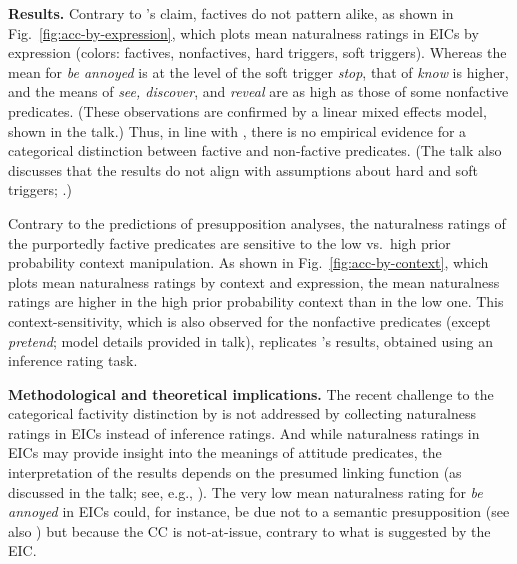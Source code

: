 \documentclass[12pt,fleqn]{article}
\newcommand{\6}{\mbox{$[\hspace*{-.6mm}[$}}
\newcommand{\9}{\mbox{$]\hspace*{-.6mm}]$}}
\newcommand{\citepos}[1]{\citeauthor{#1}'s \citeyear{#1}}
\begin{document}


\noindent
{\bf Results.} Contrary to \citepos{mandelkern-etal2020} claim, factives do not pattern alike, as shown in Fig.~\ref{fig:acc-by-expression}, which plots mean naturalness ratings in EICs by expression (colors: \color{orange}factives\color{black}, \color{gray}nonfactives\color{black}, hard triggers, \color{magenta}soft triggers\color{black}). Whereas the mean for {\em be annoyed} is at the level of the soft trigger {\em stop}, that of {\em know} is higher, and the means of {\em see, discover}, and {\em reveal} are as high as those of some nonfactive predicates. (These observations are confirmed by a linear mixed effects model, shown in the talk.) Thus, in line with \citealt{degen-tonhauser-language}, there is no empirical evidence for a categorical distinction between factive and non-factive predicates. (The talk also discusses that the results do not align with assumptions about hard and soft triggers; \citealt{simons01,abusch10}.)

Contrary to the predictions of presupposition analyses, the naturalness ratings of the purportedly factive predicates are sensitive to the low vs.\ high prior probability context manipulation. As shown in Fig.~\ref{fig:acc-by-context}, which plots mean naturalness ratings by context and expression, the mean naturalness ratings are higher in the high prior probability context than in the low one. This context-sensitivity, which is also observed for the nonfactive predicates (except {\em pretend}; model details provided in talk), replicates \citepos{degen-tonhauser-openmind} results, obtained using an inference rating task.

\noindent
{\bf Methodological and theoretical implications.} The recent challenge to the categorical factivity distinction by \citealt{degen-tonhauser-language} is not addressed by collecting naturalness ratings in EICs instead of inference ratings. And while naturalness ratings in EICs may provide insight into the meanings of attitude predicates, the interpretation of the results depends on the presumed linking function (as discussed in the talk; see, e.g., \citealt{sprouse2018}). The very low mean naturalness rating for {\em be annoyed} in EICs could, for instance, be due not to a semantic presupposition (see also \citealt{karttunen2016}) but because the CC is not-at-issue, contrary to what is suggested by the EIC.
\end{document}

